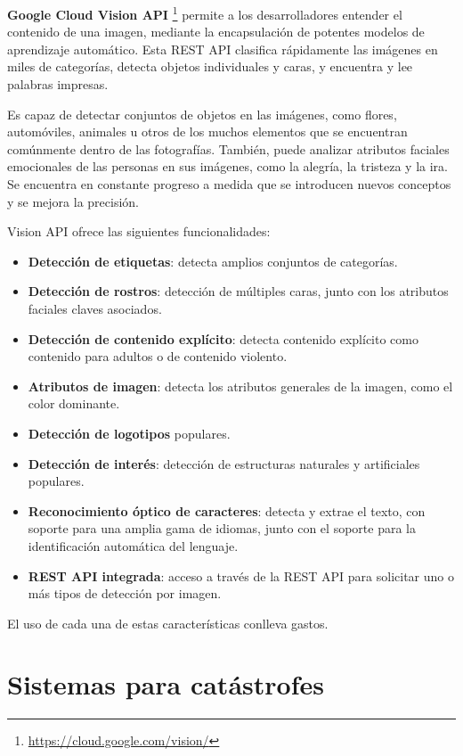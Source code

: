 \textbf{Google Cloud Vision API} \footnote{\url{https://cloud.google.com/vision/}} permite a los desarrolladores entender el contenido de una imagen, mediante la encapsulación de potentes modelos de aprendizaje automático. Esta REST API clasifica rápidamente las imágenes en miles de categorías, detecta objetos individuales y caras, y encuentra y lee palabras impresas.

Es capaz de detectar conjuntos de objetos en las imágenes, como flores, automóviles, animales u otros de los muchos elementos 
que se encuentran comúnmente dentro de las fotografías. También, puede analizar atributos faciales emocionales de las personas en sus imágenes, como la alegría, la tristeza y la ira. Se encuentra en constante progreso a medida que se introducen nuevos conceptos y se mejora la precisión.

Vision API ofrece las siguientes funcionalidades:
\begin{itemize}
\item \textbf{Detección de etiquetas}: detecta amplios conjuntos de categorías.
\item \textbf{Detección de rostros}: detección de múltiples caras, junto con los atributos faciales claves asociados.
\item \textbf{Detección de contenido explícito}: detecta contenido explícito como contenido para adultos o de contenido violento.
\item \textbf{Atributos de imagen}: detecta los atributos generales de la imagen, como el color dominante.
\item \textbf{Detección de logotipos} populares.
\item \textbf{Detección de interés}: detección de estructuras naturales y artificiales populares.
\item \textbf{Reconocimiento óptico de caracteres}: detecta y extrae el texto, con soporte para una amplia gama de idiomas, junto con el soporte para la identificación automática del lenguaje.
\item \textbf{REST API integrada}: acceso a través de la REST API para solicitar uno o más tipos de detección por imagen.
\end{itemize}

El uso de cada una de estas características conlleva gastos.

\section{Sistemas para catástrofes}
\label{sec:sistemas}


